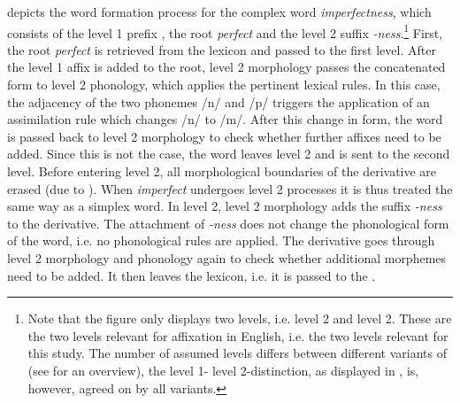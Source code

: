  depicts the word formation process for the complex word \textit{imperfectness}, which consists of the level 1 prefix , the root \textit{perfect} and the level 2 suffix \textit{-ness}.\footnote{Note that the figure only displays two levels, i.e. level 2 and level 2. These are the two levels relevant for affixation in English, i.e. the two levels relevant for this study. The number of assumed levels differs between different variants of  (see \citealt{Giegerich.1999} for an overview), the level 1- level 2-distinction, as displayed in , is, however, agreed on by all variants.}
First, the root \textit{perfect} is retrieved from the lexicon and passed to the first level. After the level 1 affix  is added to the root, level 2 morphology passes the concatenated form to level 2 phonology, which applies the pertinent lexical rules. In this case, the adjacency of the two phonemes /n/ and /p/ triggers the application of an assimilation rule which changes /n/ to /m/. After this change in form, the word is passed back to level 2 morphology to check whether further affixes need to be added. Since this is not the case, the word leaves level 2 and is sent to the second level. 
Before entering level 2, all morphological boundaries of the derivative are erased (due to ). When \textit{imperfect} undergoes level 2 processes it is thus treated the same way as a simplex word.  
In level 2, level 2 morphology adds the suffix \textit{-ness} to the derivative. The attachment of \textit{-ness} does not change the phonological form of the word, i.e. no phonological rules are applied. The derivative goes through level 2 morphology and phonology again to check whether additional morphemes need to be added. It then leaves the lexicon, i.e. it is passed to the .\\

